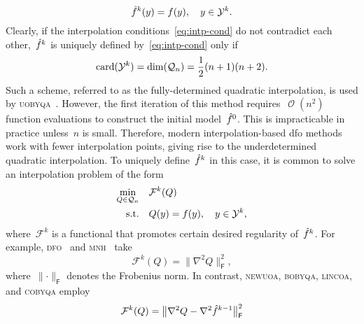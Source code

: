 \documentclass{article}
\numberwithin{equation}{section}
\theoremstyle{definition}
\theoremstyle{plain}
\theoremstyle{remark}
\DeclareMathOperator{\bigo}{\mathcal{O}}
\DeclareMathOperator{\card}{card}
\newcommand*{\norm}[2][]{#1\lVert#2#1\rVert}
\newcommand*{\obj}{f}
\newcommand*{\objm}[1][]{\hat{\obj}\ifblank{#1}{}{^{#1}}}
\newcommand*{\qpoly}{\mathcal{Q}_n}
\newcommand*{\solvername}[1]{\textsc{#1}\xspace}
\newcommand*{\xpt}[1][]{\mathcal{Y}\ifblank{#1}{}{^{#1}}}
\begin{document}
\begin{equation}
    \label{eq:intp-cond}
    \objm[k](y) = \obj(y), \quad y \in \xpt[k].
\end{equation}
Clearly, if the interpolation conditions~\eqref{eq:intp-cond} do not contradict each other,~$\objm[k]$ is uniquely defined by~\eqref{eq:intp-cond} only if
\begin{equation*}
    \card(\xpt[k]) = \dim(\qpoly) = \frac{1}{2} (n + 1) (n + 2).
\end{equation*}
Such a scheme, referred to as the fully-determined quadratic interpolation, is used by \solvername{uobyqa}~\cite{Powell_2002}.
However, the first iteration of this method requires~$\bigo(n^2)$ function evaluations to construct the initial model~$\objm[0]$.
This is impracticable in practice unless~$n$ is small.
Therefore, modern interpolation-based \gls{dfo} methods work with fewer interpolation points, giving rise to the underdetermined quadratic interpolation.
To uniquely define~$\objm[k]$ in this case, it is common to solve an interpolation problem of the form
\begin{equation}
    \label{eq:intp-var}
    \begin{aligned}
        \min_{Q \in \qpoly} & \quad \mathcal{F}^k(Q)\\
        \text{s.t.}         & \quad Q(y) = \obj(y), \quad y \in \xpt[k],
    \end{aligned}
\end{equation}
where~$\mathcal{F}^k$ is a functional that promotes certain desired regularity of~$\objm[k]$.
For example, \solvername{dfo}~\cite{Conn_Scheinberg_Toint_1998} and \solvername{mnh}~\cite{Wild_2008} take
\begin{equation}
    \label{eq:mnh}
    \mathcal{F}^k(Q) = \norm[\big]{\nabla^2 Q}_{\mathsf{F}}^2,
\end{equation}
where~$\norm{\cdot}_{\mathsf{F}}$ denotes the Frobenius norm. In contrast, \solvername{newuoa}, \solvername{bobyqa}, \solvername{lincoa}, and \solvername{cobyqa} employ
\begin{equation}
    \label{eq:df-psb}
    \mathcal{F}^k(Q) = \norm[\big]{\nabla^2 Q - \nabla^2 \objm[k - 1]}_{\mathsf{F}}^2
\end{equation}
\end{document}
